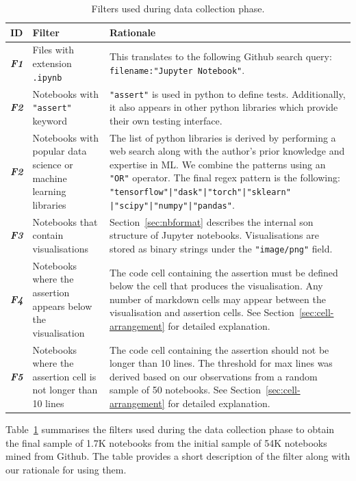 \documentclass[acmsmall,screen,review,anonymous]{acmart}
\begin{document}
\begin{table}
  \centering
  \caption{Filters used during data collection phase.}
  \begin{tabular}{l p{} p{}}
    \toprule
    \textbf{ID} &
    \textbf{Filter} &
    \textbf{Rationale}\\
    \midrule
    \emph{\textbf{F1}} &
    Files with extension \texttt{.ipynb} &
    This translates to the following Github search query:
    \texttt{filename:"Jupyter Notebook"}.\\
    \emph{\textbf{F2}} &
    Notebooks with \texttt{"assert"} keyword &
    \texttt{"assert"} is used in python to define tests. Additionally,
    it also appears in other python libraries which provide their own
    testing interface.\\
    \emph{\textbf{F2}} &
    Notebooks with popular data science or machine learning libraries &
    The list of python libraries is derived by performing a web search
    along with the author's prior knowledge and expertise in ML. We
    combine the patterns using an \texttt{"OR"} operator. The final
    regex pattern is the following:
    \texttt{"tensorflow"|"dask"|"torch"|"sklearn"
    |"scipy"|"numpy"|"pandas"}.\\
    \emph{\textbf{F3}} &
    Notebooks that contain visualisations &
    Section~\ref{sec:nbformat} describes the internal son structure
    of Jupyter notebooks. Visualisations are stored as binary strings
    under the \texttt{"image/png"} field.\\
    \emph{\textbf{F4}} &
    Notebooks where the assertion appears below the visualisation &
    The code cell containing the assertion must be defined below the
    cell that produces the visualisation. Any number of markdown cells
    may appear between the visualisation and assertion cells. See
    Section~\ref{sec:cell-arrangement} for detailed explanation.\\
    \emph{\textbf{F5}} &
    Notebooks where the assertion cell is not longer than 10 lines &
    The code cell containing the assertion should not be longer than
    10 lines. The threshold for max lines was derived based on our
    observations from a random sample of 50 notebooks. See
    Section~\ref{sec:cell-arrangement} for detailed explanation.\\
    \bottomrule
  \end{tabular}
  \label{tab:filters}
\end{table}

Table~\ref{tab:filters} summarises the filters used during the data
collection phase to obtain the final sample of 1.7K notebooks from the
initial sample of 54K notebooks mined from Github. The table provides
a short description of the filter along with our rationale for using
them.
\end{document}
